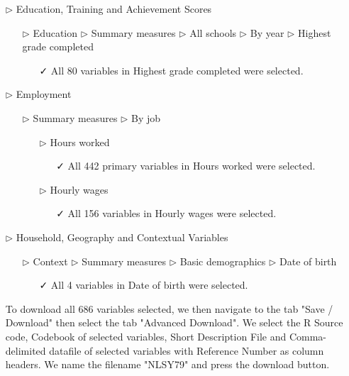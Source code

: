 \documentclass[12pt]{article}
\begin{document}
\begin{tcolorbox}[label="box:data", title=Navigating the data source to download the raw data]
\begin{itemize}
\item[$\triangleright$] Education, Training and Achievement Scores
\begin{itemize}
\item[$\triangleright$] Education $\triangleright$ Summary measures $\triangleright$ All schools $\triangleright$ By year $\triangleright$ Highest grade completed
\begin{itemize}
\item[\faCheck] All 80 variables in Highest grade completed were selected.
\end{itemize}
\end{itemize}
\item[$\triangleright$] Employment
\begin{itemize}
\item[$\triangleright$] Summary measures $\triangleright$ By job
\begin{itemize}
\item[$\triangleright$] Hours worked  
\begin{itemize}
\item[\faCheck] All 442 primary variables in Hours worked were selected.
\end{itemize}
\item[$\triangleright$] Hourly wages
\begin{itemize}
\item[\faCheck] All 156 variables in Hourly wages were selected.
\end{itemize}
\end{itemize}
\end{itemize}
\item[$\triangleright$] Household, Geography and Contextual Variables
\begin{itemize}
\item[$\triangleright$] Context $\triangleright$ Summary measures $\triangleright$ Basic demographics $\triangleright$ Date of birth
\begin{itemize}
\item[\faCheck] All 4 variables in Date of birth were selected. 
\end{itemize}
\end{itemize}
\end{itemize}
\begin{itemize}
\item[\faCloudDownload] To download all 686 variables selected, we then navigate to the tab "Save / Download" then select the tab "Advanced Download". We select the R Source code, Codebook of selected variables, Short Description File and Comma-delimited datafile of selected variables with Reference Number as column headers. We name the filename "NLSY79" and press the download button.
\end{itemize}

\end{tcolorbox}
\end{document}
